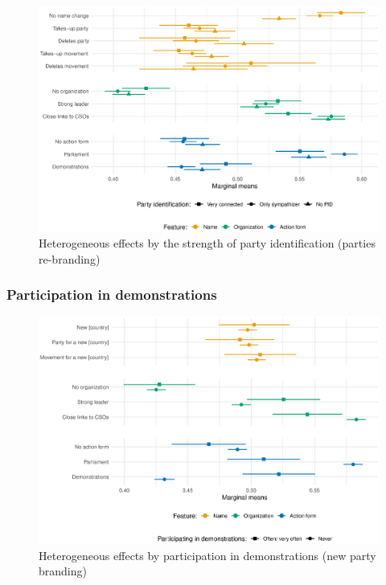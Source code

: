 \documentclass[12pt]{article}
\begin{document}
\begin{figure}[H]
\includegraphics[width=\textwidth]{./Figures/CJ2_heteff_pid_strength_tradeoff.eps}
\caption{Heterogeneous effects by the strength of party identification (parties re-branding)}
\end{figure}

\subsubsection{Participation in demonstrations}

\begin{figure}[H]
\includegraphics[width=\textwidth]{./Figures/CJ1_heteff_act_demo_tradeoff.eps}
\caption{Heterogeneous effects by participation in demonstrations (new party branding)}
\end{figure}
\end{document}
